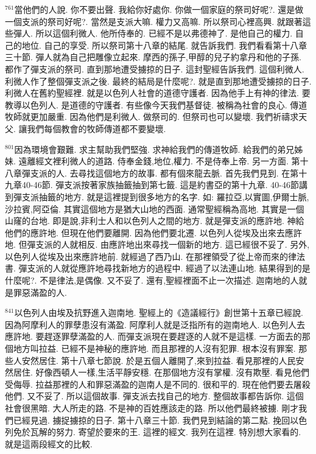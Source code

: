 \documentclass{book}
\begin{document}
$^{761}$當他們的人說.
你不要出聲.
我給你好處你.
你做一個家庭的祭司好呢?.
還是做一個支派的祭司好呢?.
當然是支派大嘛.
權力又高嘛.
所以祭司心裡高興.
就跟著這些彈人.
所以這個利微人.
他所侍奉的.
已經不是以弗德神了.
是他自己的權力.
自己的地位.
自己的享受.
所以祭司第十八章的結尾.
就告訴我們.
我們看看第十八章三十節.
彈人就為自己把雕像立起來.
摩西的孫子,甲醇的兒子約拿丹和他的子孫.
都作了彈支派的祭司.
直到那地遭受擄掠的日子.
這封聖經告訴我們.
這個利微人.
利微人作了整個彈支派之後.
最終的結局是什麼呢?.
就是直到那地遭受擄掠的日子.
利微人在舊約聖經裡.
就是以色列人社會的道德守護者.
因為他手上有神的律法.
要教導以色列人.
是道德的守護者.
有些像今天我們基督徒.
被稱為社會的良心.
傳道牧師就更加嚴重.
因為他們是利微人.
做祭司的.
但祭司也可以變壞.
我們祈禱求天父.
讓我們每個教會的牧師傳道都不要變壞.

$^{801}$因為環境會艱難.
求主幫助我們堅強.
求神給我們的傳道牧師.
給我們的弟兄姊妹.
遠離經文裡利微人的道路.
侍奉金錢,地位,權力.
不是侍奉上帝.
另一方面.
第十八章彈支派的人.
去尋找這個地方的故事.
都有個來龍去脈.
首先我們見到.
在第十九章40-46節.
彈支派按著家族抽籤抽到第七籤.
這是約書亞的第十九章.
40-46節講到彈支派抽籤的地方.
就是這裡提到很多地方的名字.
如: 羅拉亞,以實圖,伊爾士脈,沙拉賓,阿亞倫.
其實這個地方是猶大山地的西面.
通常聖經稱為高地.
其實是一個山窿的台地.
即是說,非利士人和以色列人之間的地方.
就是彈支派的應許地.
神給他們的應許地.
但現在他們要離開.
因為他們要北遷.
以色列人從埃及出來去應許地.
但彈支派的人就相反.
由應許地出來尋找一個新的地方.
這已經很不妥了.
另外,以色列人從埃及出來應許地前.
就經過了西乃山.
在那裡領受了從上帝而來的律法書.
彈支派的人就從應許地尋找新地方的過程中.
經過了以法連山地.
結果得到的是什麼呢?.
不是律法,是偶像.
又不妥了.
還有,聖經裡面不止一次描述.
迦南地的人就是罪惡滿盈的人.

$^{841}$以色列人由埃及抗野進入迦南地.
聖經上的《造議經行》創世第十五章已經說.
因為阿摩利人的罪孽患沒有滿盈.
阿摩利人就是泛指所有的迦南地人.
以色列人去應許地.
要趕逐罪孽滿盈的人.
而彈支派現在要趕逐的人就不是這樣.
一方面去的那個地方叫拉益.
已經不是神秘的應許地.
而且那裡的人沒有犯罪.
根本沒有罪案.
那些人安然居住.
第十八章七節說.
於是五個人離開了,來到拉益.
看見那裡的人民安然居住.
好像西頓人一樣,生活平靜安穩.
在那個地方沒有掌權.
沒有欺壓.
看見他們受侮辱.
拉益那裡的人和罪惡滿盈的迦南人是不同的.
很和平的.
現在他們要去屠殺他們.
又不妥了.
所以這個故事.
彈支派去找自己的地方.
整個故事都告訴你.
這個社會很黑暗.
大人所走的路.
不是神的百姓應該走的路.
所以他們最終被擄.
剛才我們已經見過.
擄捉擄掠的日子.
第十八章三十節.
我們見到結論的第二點.
挽回以色列免於瓦解的努力.
寄望於要來的王.
這裡的經文.
我列在這裡.
特別想大家看的.
就是這兩段經文的比較.
\end{document}
